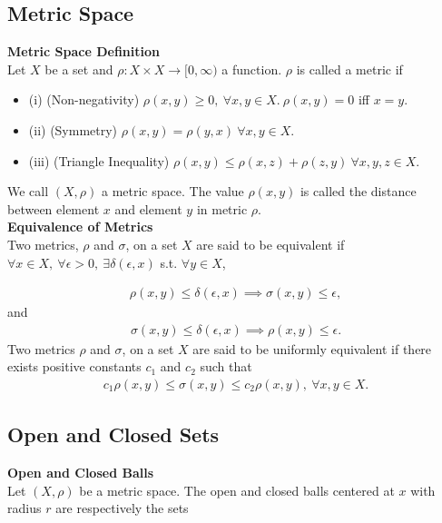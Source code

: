\documentclass{article}
\numberwithin{theorem}{subsection}
\numberwithin{theorem}{subsubsection}
\theoremstyle{definition}
\numberwithin{definition}{subsection}
\numberwithin{definition}{subsubsection}
\begin{document}
\subsection{Metric Space}

\noindent \textbf{Metric Space Definition} \\
\indent Let $X$ be a set and $\rho: X \times X \rightarrow [0,\infty)$ a function. $\rho$ is called a metric if
\begin{itemize}
    \item (i) (Non-negativity) $\rho(x,y) \geq 0,\ \forall x,y \in X.\ \rho(x,y) = 0$ iff $x = y$.
    \item (ii) (Symmetry) $\rho(x,y) = \rho(y,x)\ \forall x,y \in X$. 
    \item (iii) (Triangle Inequality) $\rho(x,y) \leq \rho(x,z) + \rho(z,y)\ \forall x,y,z \in X$.
\end{itemize}
We call $(X,\rho)$ a metric space. The value $\rho(x,y)$ is called the distance between element $x$ and element $y$ in metric $\rho$.
\\

\noindent \textbf{Equivalence of Metrics} \\
\indent Two metrics, $\rho$ and $\sigma$, on a set $X$ are said to be equivalent if $\forall x \in X,\ \forall \epsilon > 0,\ \exists \delta(\epsilon, x)$ s.t. $\forall y \in X$,

\begin{gather*}
    \rho(x,y) \leq \delta(\epsilon, x) \implies \sigma(x,y) \leq \epsilon,
\end{gather*}
\noindent and
\begin{gather*}
    \sigma(x,y) \leq \delta(\epsilon, x) \implies \rho(x,y) \leq \epsilon.
\end{gather*}
\indent Two metrics $\rho$ and $\sigma$, on a set $X$ are said to be uniformly equivalent if there exists positive constants $c_{1}$ and $c_{2}$ such that
\begin{gather*}
    c_{1}\rho(x,y) \leq \sigma(x,y) \leq c_{2}\rho(x,y),\ \forall x,y\in X.
\end{gather*}

\subsection{Open and Closed Sets}

\noindent \textbf{Open and Closed Balls} \\
\indent Let $(X,\rho)$ be a metric space. The open and closed balls centered at $x$ with radius $r$ are respectively the sets
\end{document}
